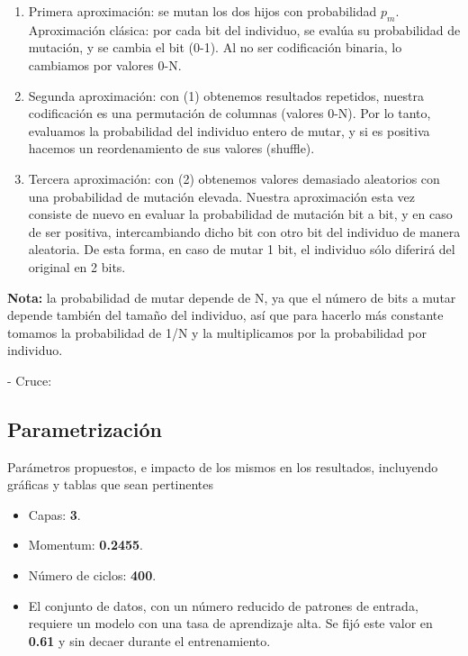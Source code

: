 \documentclass[12pt]{article}
\begin{document}
\begin{enumerate}
    \item Primera aproximación: se mutan los dos hijos con probabilidad $p_m$. Aproximación clásica: por cada bit del individuo, se evalúa su probabilidad de mutación, y se cambia el bit (0-1). Al no ser codificación binaria, lo cambiamos por valores 0-N.
    \item Segunda aproximación: con (1) obtenemos resultados repetidos, nuestra codificación es una permutación de columnas (valores 0-N). Por lo tanto, evaluamos la probabilidad del individuo entero de mutar, y si es positiva hacemos un reordenamiento de sus valores (shuffle).
    \item Tercera aproximación: con (2) obtenemos valores demasiado aleatorios con una probabilidad de mutación elevada. Nuestra aproximación esta vez consiste de nuevo en evaluar la probabilidad de mutación bit a bit, y en caso de ser positiva, intercambiando dicho bit con otro bit del individuo de manera aleatoria. De esta forma, en caso de mutar 1 bit, el individuo sólo diferirá del original en 2 bits.
    
\end{enumerate}
\textbf{Nota:}
la probabilidad de mutar depende de N, ya que el número de bits a mutar depende también del tamaño del individuo, así que para hacerlo más constante tomamos la probabilidad de 1/N y la multiplicamos por la probabilidad por individuo.


- Cruce:


\subsection{Parametrización}

Parámetros propuestos, e impacto de los mismos en los 
resultados, incluyendo 
gráficas y 
tablas que sean pertinentes

\begin{itemize}
    \setlength\itemsep{0em}
    \item Capas: \textbf{3}.
    \item Momentum: \textbf{0.2455}.
    \item Número de ciclos: \textbf{400}.
    \item El conjunto de datos, con un número reducido de patrones de
    entrada, requiere un modelo con una tasa de aprendizaje alta. Se fijó este
    valor en \textbf{0.61} y sin decaer durante el entrenamiento.
\end{itemize}
\end{document}
